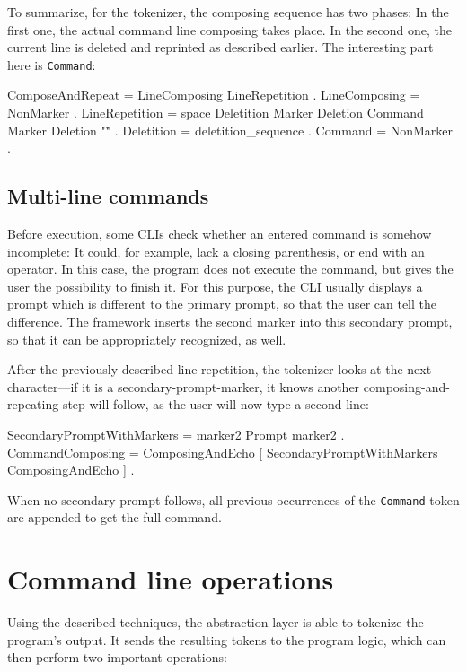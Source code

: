 \documentclass[paper=a4,abstract=on,cleardoublepage=empty,numbers=noenddot,toc=bib,12pt,appendixprefix=true]{scrreprt}
\begin{document}
To summarize, for the tokenizer, the composing sequence has two phases: In the first one, the actual command line composing takes place. In the second one, the current line is deleted and reprinted as described earlier. The interesting part here is \texttt{Command}:

\begin{ebnf}
ComposeAndRepeat = LineComposing LineRepetition .
LineComposing = { NonMarker } .
LineRepetition = space Deletition Marker Deletion Command
    Marker Deletion "\r" .
Deletition = { deletition_sequence } .
Command = { NonMarker } .
\end{ebnf}

\subsection*{Multi-line commands}

Before execution, some \textsc{CLI}s check whether an entered command is somehow incomplete: It could, for example, lack a closing parenthesis, or end with an operator. In this case, the program does not execute the command, but gives the user the possibility to finish it. For this purpose, the \textsc{CLI} usually displays a prompt which is different to the primary prompt, so that the user can tell the difference. The framework inserts the second marker into this secondary prompt, so that it can be appropriately recognized, as well.

After the previously described line repetition, the tokenizer looks at the next character---if it is a secondary-prompt-marker, it knows another composing-and-repeating step will follow, as the user will now type a second line:

\begin{ebnf}
SecondaryPromptWithMarkers = marker2 Prompt marker2 .
CommandComposing = ComposingAndEcho
    [ { SecondaryPromptWithMarkers ComposingAndEcho } ] .
\end{ebnf}
%
When no secondary prompt follows, all previous occurrences of the \texttt{Command} token are appended to get the full command.

\section{Command line operations}
\label{sec:cliops}

Using the described techniques, the abstraction layer is able to tokenize the program's output. It sends the resulting tokens to the program logic, which can then perform two important operations:
\end{document}
